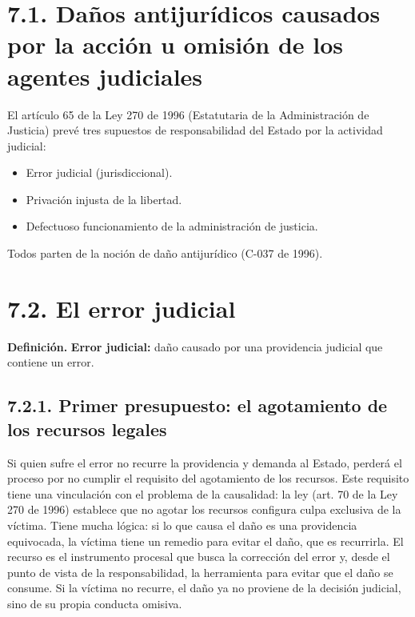 
\section{7.1. Daños antijurídicos causados por la acción u omisión de los agentes judiciales}
El artículo 65 de la Ley 270 de 1996 (Estatutaria de la Administración de Justicia) prevé tres supuestos de responsabilidad del Estado por la actividad judicial:

\begin{itemize}
\item Error judicial (jurisdiccional).
\item Privación injusta de la libertad.
\item Defectuoso funcionamiento de la administración de justicia.
\end{itemize}
Todos parten de la noción de daño antijurídico (C-037 de 1996).

\section{7.2. El error judicial}
\begin{definicion}
\textcolor[HTML]{1F3864}{\textbf{Definición. }}\textbf{Error judicial: }daño causado por una providencia judicial que contiene un error.
\end{definicion}
\subsection{7.2.1. Primer presupuesto: el agotamiento de los recursos legales}
Si quien sufre el error no recurre la providencia y demanda al Estado, perderá el proceso por no cumplir el requisito del agotamiento de los recursos. Este requisito tiene una vinculación con el problema de la causalidad: la ley (art. 70 de la Ley 270 de 1996) establece que no agotar los recursos configura culpa exclusiva de la víctima. Tiene mucha lógica: si lo que causa el daño es una providencia equivocada, la víctima tiene un remedio para evitar el daño, que es recurrirla. El recurso es el instrumento procesal que busca la corrección del error y, desde el punto de vista de la responsabilidad, la herramienta para evitar que el daño se consume. Si la víctima no recurre, el daño ya no proviene de la decisión judicial, sino de su propia conducta omisiva.

